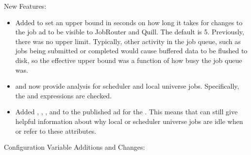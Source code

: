 \noindent New Features:

\begin{itemize}

\item Added  to set an
upper bound in seconds on how long it takes for changes to the job
ad to be visible to JobRouter and Quill.  The default is 5.
Previously, there was no upper limit.  Typically, other activity in
the job queue, such as jobs being submitted or completed would cause
buffered data to be flushed to disk, so the effective upper bound was
a function of how busy the job queue was.

\item {}  and  now provide
  analysis for scheduler and local universe jobs.  Specifically, the
   and
   expressions are checked.

\item Added , ,
, and 
to the published ad for the .  This means that
  can still give helpful information about
why local or scheduler universe jobs are idle when
 or
 refer to these attributes.

\end{itemize}

\noindent Configuration Variable Additions and Changes:

